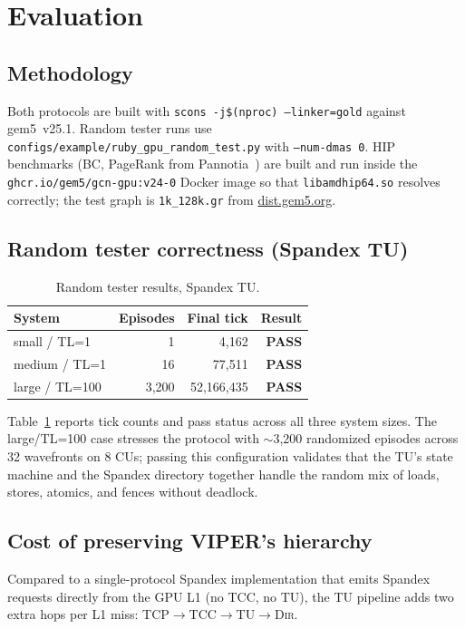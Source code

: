 \documentclass[conference,letterpaper,10pt]{IEEEtran}
\def\spxRTsmall{4{,}162}
\def\spxRTmedium{77{,}511}
\def\spxRTlarge{52{,}166{,}435}
\begin{document}
\section{Evaluation}

\subsection{Methodology}
Both protocols are built with \texttt{scons -j\$(nproc) --linker=gold}
against gem5~v25.1. Random tester runs use
\texttt{configs/example/ruby\_gpu\_random\_test.py} with
\texttt{--num-dmas 0}. HIP benchmarks (BC, PageRank from
Pannotia~\cite{pannotia}) are built and run inside the
\texttt{ghcr.io/gem5/gcn-gpu:v24-0} Docker image so that
\texttt{libamdhip64.so} resolves correctly; the test graph is
\texttt{1k\_128k.gr} from \url{dist.gem5.org}.

\subsection{Random tester correctness (Spandex TU)}

\begin{table}[t]
\centering
\caption{Random tester results, Spandex TU.}
\label{tab:random-tester}
\small
\begin{tabular}{lrrr}
\toprule
\textbf{System} & \textbf{Episodes} & \textbf{Final tick} & \textbf{Result} \\
\midrule
small  / TL=1   & 1     & \spxRTsmall  & \textbf{PASS} \\
medium / TL=1   & 16    & \spxRTmedium & \textbf{PASS} \\
large  / TL=100 & 3{,}200 & \spxRTlarge  & \textbf{PASS} \\
\bottomrule
\end{tabular}
\end{table}

Table~\ref{tab:random-tester} reports tick counts and pass status
across all three system sizes. The large/TL=100 case stresses the
protocol with $\sim$3{,}200 randomized episodes across 32 wavefronts
on 8 CUs; passing this configuration validates that the TU's state
machine and the Spandex directory together handle the random mix of
loads, stores, atomics, and fences without deadlock.

\subsection{Cost of preserving VIPER's hierarchy}
Compared to a single-protocol Spandex implementation that emits
Spandex requests directly from the GPU L1 (no TCC, no TU), the TU
pipeline adds two extra hops per L1 miss:
TCP$\to$TCC$\to$TU$\to$\textsc{Dir}.
\end{document}
